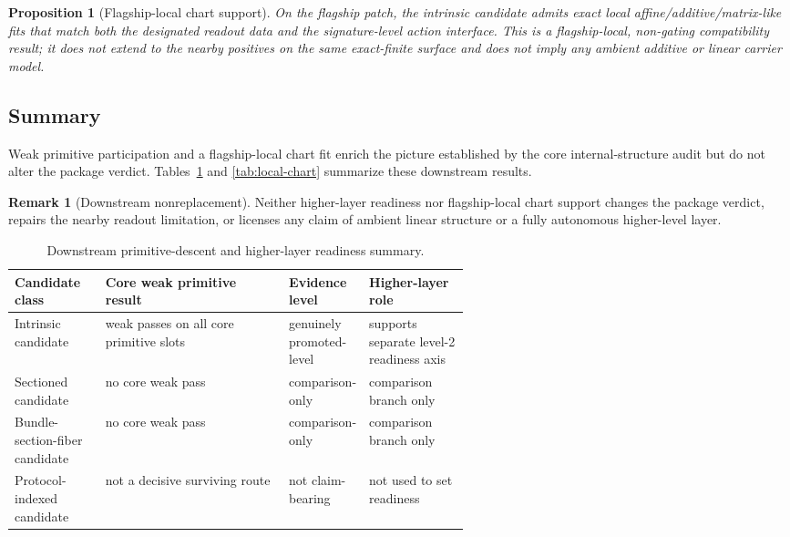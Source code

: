 \documentclass[11pt]{article}
\newtheorem{proposition}[theorem]{Proposition}
\theoremstyle{definition}
\newtheorem{remark}[theorem]{Remark}
\begin{document}
\begin{proposition}[Flagship-local chart support]
\label{prop:local-chart}
On the flagship patch, the intrinsic candidate admits exact local affine/additive/matrix-like fits that match both the designated readout data and the signature-level action interface. This is a flagship-local, non-gating compatibility result; it does not extend to the nearby positives on the same exact-finite surface and does not imply any ambient additive or linear carrier model.
\end{proposition}

\subsection{Summary}

Weak primitive participation and a flagship-local chart fit enrich the picture established by the core internal-structure audit but do not alter the package verdict. Tables~\ref{tab:primitive-readiness} and \ref{tab:local-chart} summarize these downstream results.

\begin{remark}[Downstream nonreplacement]
\label{rem:downstream-nonreplacement}
Neither higher-layer readiness nor flagship-local chart support changes the package verdict, repairs the nearby readout limitation, or licenses any claim of ambient linear structure or a fully autonomous higher-level layer.
\end{remark}

\begin{table}[t]
\centering
\small
\begin{tabularx}{\linewidth}{@{}>{\raggedright\arraybackslash}p{0.20\linewidth}>{\raggedright\arraybackslash}X>{\raggedright\arraybackslash}p{0.16\linewidth}>{\raggedright\arraybackslash}p{0.22\linewidth}@{}}
\toprule
Candidate class & Core weak primitive result & Evidence level & Higher-layer role \\
\midrule
Intrinsic candidate & weak passes on all core primitive slots & genuinely promoted-level & supports separate level-2 readiness axis \\
Sectioned candidate & no core weak pass & comparison-only & comparison branch only \\
Bundle-section-fiber candidate & no core weak pass & comparison-only & comparison branch only \\
Protocol-indexed candidate & not a decisive surviving route & not claim-bearing & not used to set readiness \\
\bottomrule
\end{tabularx}
\caption{Downstream primitive-descent and higher-layer readiness summary.}
\label{tab:primitive-readiness}
\end{table}
\end{document}
